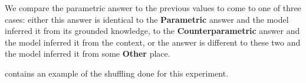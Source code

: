 We compare the parametric answer to the previous values to come to one of three cases: either this answer is identical to the \textbf{Parametric} answer and the model inferred it from its grounded knowledge, to the \textbf{Counterparametric} answer and the model inferred it from the context, or the answer is different to these two and the model inferred it from some \textbf{Other} place.

 contains an example of the shuffling done for this experiment.

\begin{table}[p]
	\newcommand{\vwidth}[1]{\begin{minipage}[t][][t]{38ex}\ttfamily #1\end{minipage}}
	\newcommand{\rep}[1]{{\setlength{\fboxsep}{0pt}\fcolorbox{Gray}{Gray!80}{\textit{#1}}}}

	\centering
	\scriptsize


\end{table}
